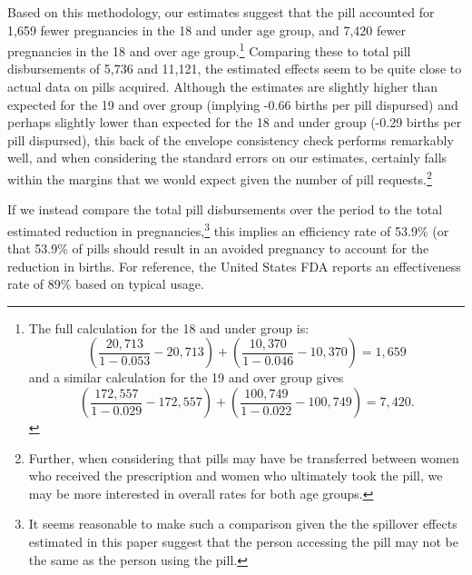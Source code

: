 \documentclass[11pt,subeqn]{article}
\begin{document}
\begin{spacing}{1.4}
Based on this methodology, our estimates suggest that the pill accounted for 
1,659 fewer pregnancies in the 18 and under age group, and 7,420 fewer 
pregnancies in the 18 and over age group.\footnote{The full calculation for the 
18 and under group is:
\begin{equation}
\nonumber
\left(\frac{20,713}{1-0.053}-20,713\right)+
\left(\frac{10,370}{1-0.046}-10,370\right)=1,659
\end{equation}
and a similar calculation for the 19 and over group gives 
\begin{equation}
\nonumber
\left(\frac{172,557}{1-0.029}-172,557\right)+
\left(\frac{100,749}{1-0.022}-100,749\right)=7,420.
\end{equation}
}
Comparing these to total pill disbursements of 5,736 and 11,121, the estimated
effects seem to be quite close to actual data on pills acquired.  Although the
estimates are slightly higher than expected for the 19 and over group (implying
-0.66 births per pill dispursed) and perhaps slightly lower than expected for the
18 and under group (-0.29 births per pill dispursed), this back of the envelope 
consistency check performs remarkably well, and when considering the standard 
errors on our estimates, certainly falls within the margins that we would expect
given the number of pill requests.\footnote{Further, when considering that
pills may have be transferred between women who received the prescription and
women who ultimately took the pill, we may be more interested in overall rates
for both age groups.}

If we instead compare the total pill disbursements over the period to the 
total estimated reduction in pregnancies,\footnote{It seems reasonable to make 
such a comparison given the the spillover effects estimated in this paper suggest 
that the person accessing the pill may not be the same as the person using the 
pill.}  this implies an efficiency rate of 53.9\% (or that 53.9\% of pills should 
result in an avoided pregnancy to account for the reduction in births.  For 
reference, the United States FDA reports an effectiveness rate of 89\% based on
typical usage.



\newpage



\end{spacing}
\end{document}
